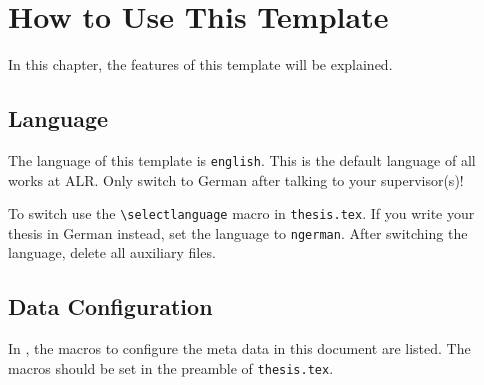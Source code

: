 
\chapter{How to Use This Template}

In this chapter, the features of this template will be explained.


\section{Language}\label{s:language}

The language of this template is \texttt{english}. This is the default language of all works at ALR. Only switch to German after talking to your supervisor(s)!

To switch use the  \texttt{\textbackslash{}selectlanguage} macro in \texttt{thesis.tex}.
If you write your thesis in German instead, set the language to \texttt{ngerman}.
After switching the language, delete all auxiliary files.


\section{Data Configuration}

In , the macros to configure the meta data in this document are listed.
The macros should be set in the preamble of \texttt{thesis.tex}.

